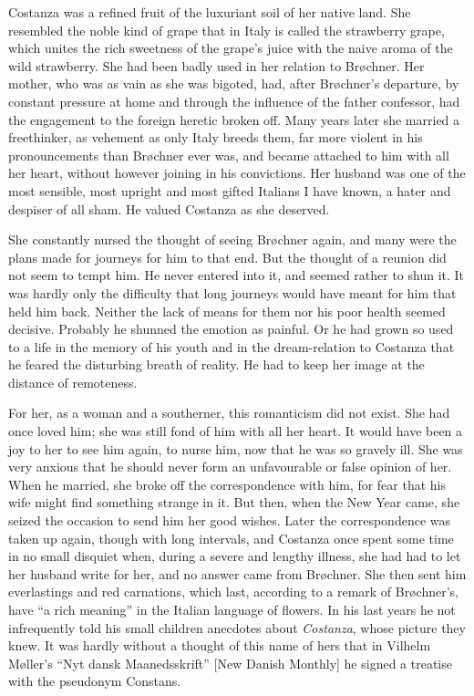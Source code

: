 \documentclass[12pt,a4paper,openany]{book}
\newcommand{\opage}[1]{\marginnote{\footnotesize\textit{[#1]}}}
\begin{document}
Costanza was a refined fruit of the luxuriant soil of her native land. She
resembled the noble kind of grape that in Italy is called the strawberry
grape, which unites the rich sweetness of the grape's juice with the naive
aroma of the wild strawberry. She had been badly used in her relation to
Brøchner. Her mother, who was as vain as she was bigoted, had, after
Brøchner's departure, by constant pressure at home and through the influence
of the father confessor, had the engagement to the foreign heretic broken off.
Many years later she married a freethinker, as vehement as only Italy breeds
them, far more violent in his pronouncements than Brøchner ever was, and
became attached to him with all her heart, without however joining in his
convictions. Her husband was one of the most sensible, most upright and most
gifted Italians I
\opage{241}have known, a hater and despiser of all sham. He valued Costanza as she
deserved.

She constantly nursed the thought of seeing Brøchner again, and many were the
plans made for journeys for him to that end. But the thought of a reunion did
not seem to tempt him. He never entered into it, and seemed rather to shun it.
It was hardly only the difficulty that long journeys would have meant for him
that held him back. Neither the lack of means for them nor his poor health
seemed decisive. Probably he shunned the emotion as painful. Or he had grown so
used to a life in the memory of his youth and in the dream-relation to
Costanza that he feared the disturbing breath of reality. He had to keep her
image at the distance of remoteness.

For her, as a woman and a southerner, this romanticism did not exist. She had
once loved him; she was still fond of him with all her heart. It would have
been a joy to her to see him again, to nurse him, now that he was so gravely
ill. She was very anxious that he should never form an unfavourable or false
opinion of her. When he married, she broke off the correspondence with him,
for fear that his wife might find something strange
\opage{242}in it. But then, when the New Year came, she seized the occasion to send him
her good wishes. Later the correspondence was taken up again, though with long
intervals, and Costanza once spent some time in no small disquiet when, during
a severe and lengthy illness, she had had to let her husband write for her,
and no answer came from Brøchner. She then sent him everlastings and red
carnations, which last, according to a remark of Brøchner's, have ``a rich
meaning'' in the Italian language of flowers. In his last years he not
infrequently told his small children anecdotes about \emph{Costanza}, whose
picture they knew. It was hardly without a thought of this name of hers that in
Vilhelm Møller's ``Nyt dansk Maanedsskrift'' [New Danish Monthly] he signed a
treatise with the pseudonym Constans.
\end{document}
